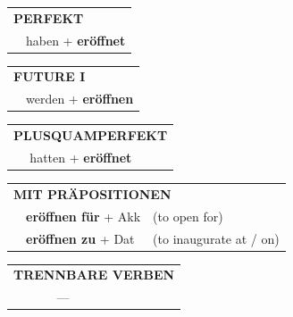 \documentclass[10pt,a4paper]{revtex4-2}
\begin{document}
\begin{verbbox}
\vspace{10pt}

\begin{tabular}{rl}
\multicolumn{2}{l}{\textbf{PERFEKT}}\\
& haben + \textbf{eröffnet}\\
\end{tabular}
\hfill
\begin{tabular}{rl}
\multicolumn{2}{l}{\textbf{FUTURE I}}\\
& werden + \textbf{eröffnen}\\
\end{tabular}
\hfill
\begin{tabular}{rl}
\multicolumn{2}{l}{\textbf{PLUSQUAMPERFEKT}}\\
& hatten + \textbf{eröffnet}\\
\end{tabular}

\vspace{10pt}

\begin{tabular}{lll}
\multicolumn{3}{l}{\textbf{MIT PRÄPOSITIONEN}}\\
& \textbf{eröffnen für} + Akk & (to open for)\\
& \textbf{eröffnen zu} + Dat & (to inaugurate at / on)\\
\end{tabular}
\hfill
\begin{tabular}{lll}
\multicolumn{3}{l}{\textbf{TRENNBARE VERBEN}}\\
& --- & \\
\end{tabular}
\vspace{-5pt}
\end{verbbox}
\end{document}
